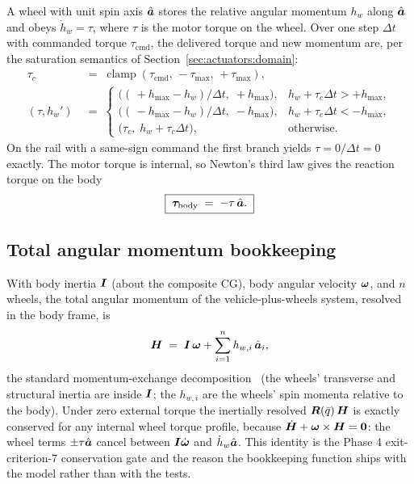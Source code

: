 A wheel with unit spin axis $\hat{\bm{a}}$ stores the relative angular
momentum $h_w$ along $\hat{\bm{a}}$ and obeys $\dot{h}_w = \tau$, where
$\tau$ is the motor torque on the wheel. Over one step $\Delta t$ with
commanded torque $\tau_{\mathrm{cmd}}$, the delivered torque and new
momentum are, per the saturation semantics of
Section~\ref{sec:actuators:domain}:
\begin{equation}
  \begin{aligned}
    \tau_c &\;=\; \operatorname{clamp}(\tau_{\mathrm{cmd}},\,
      -\tau_{\max},\, +\tau_{\max}), \\
    (\tau, h_w') &\;=\;
    \begin{cases}
      \bigl( (\,+h_{\max} - h_w)/\Delta t,\; +h_{\max} \bigr),
        & h_w + \tau_c \Delta t > +h_{\max}, \\
      \bigl( (\,-h_{\max} - h_w)/\Delta t,\; -h_{\max} \bigr),
        & h_w + \tau_c \Delta t < -h_{\max}, \\
      \bigl( \tau_c,\; h_w + \tau_c \Delta t \bigr),
        & \text{otherwise}.
    \end{cases}
  \end{aligned}
  \label{eq:actuators:wheelclamp}
\end{equation}
On the rail with a same-sign command the first branch yields
$\tau = 0 / \Delta t = 0$ exactly. The motor torque is internal, so
Newton's third law gives the reaction torque on the body
\begin{equation}
  \boxed{\; \bm{\tau}_{\mathrm{body}} \;=\; -\tau\, \hat{\bm{a}}. \;}
  \label{eq:actuators:wheelreaction}
\end{equation}

\subsection{Total angular momentum bookkeeping}

With body inertia $\bm{I}$ (about the composite CG), body angular
velocity $\bm{\omega}$, and $n$ wheels, the total angular momentum of
the vehicle-plus-wheels system, resolved in the body frame, is
\begin{equation}
  \bm{H} \;=\; \bm{I}\, \bm{\omega}
    + \sum_{i=1}^{n} h_{w,i}\, \hat{\bm{a}}_i,
  \label{eq:actuators:totalmomentum}
\end{equation}
the standard momentum-exchange decomposition~\cite{markley2014} (the
wheels' transverse and structural inertia are inside $\bm{I}$; the
$h_{w,i}$ are the wheels' spin momenta relative to the body). Under
zero external torque the inertially resolved
$\bm{R}(\bar{q})\,\bm{H}$ is exactly conserved for any internal wheel
torque profile, because
$\dot{\bm{H}} + \bm{\omega} \times \bm{H} = \bm{0}$: the wheel terms
$\pm\tau \hat{\bm{a}}$ cancel between $\bm{I}\dot{\bm{\omega}}$ and
$\dot{h}_w \hat{\bm{a}}$. This identity is the Phase 4
exit-criterion-7 conservation gate and the reason the bookkeeping
function ships with the model rather than with the tests.

